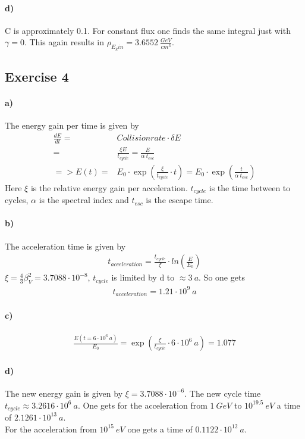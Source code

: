 \documentclass[10pt,a4paper]{article}
\begin{document}
\paragraph*{d)}
C is approximately 0.1. For constant flux one finds the same integral just with $\gamma = 0$. This again results in $\rho_{E_kin} = 3.6552\ \frac{GeV}{cm^3}$.

\subsection*{Exercise 4}
\paragraph*{a)}
The energy gain per time is given by 
\begin{align*}
\frac{dE}{dt} = &Collisionrate \cdot  \delta E \\
= &\frac{\xi E}{t_{cycle}} = \frac{E}{\alpha\ t_{esc}}\\
=> E(t) = &E_0 \cdot \exp\left(\frac{\xi}{t_{cycle}}\cdot t\right) = E_0 \cdot \exp\left(\frac{t}{\alpha\ t_{esc}}\right)
\end{align*}
Here $\xi$ is the relative energy gain per acceleration. $t_{cycle}$ is the time between to cycles, $\alpha$ is the spectral index and $t_{esc}$ is the escape time.

\paragraph{b)}
The acceleration time is given by
\begin{align*}
t_{acceleration} = \frac{t_{cycle}}{\xi} \cdot ln\left(\frac{E}{E_0}\right)
\end{align*}
$\xi = \frac{4}{3} \beta_V^2 = 3.7088 \cdot 10^{-8}$, $t_{cycle}$ is limited by d to $\approx 3\ a$. So one gets
\begin{align*}
t_{acceleration} = 1.21 \cdot 10^9\ a
\end{align*}

\paragraph{c)}
\begin{align*}
\frac{E(t=6\cdot 10^6\ a)}{E_0} = \exp\left(\frac{\xi}{t_{cycle}}\cdot 6\cdot 10^6\ a\right) = 1.077
\end{align*}

\paragraph{d)}
The new energy gain is given by $\xi = 3.7088\cdot 10^{-6}$. The new cycle time $t_{cycle} \approx 3.2616 \cdot 10^6\ a$. One gets for the acceleration from $1\ GeV$ to $10^{19.5}\ eV$ a time of $2.1261 \cdot 10^{13}\ a$. \\
For the acceleration from $10^{15}\ eV$ one gets a time of $0.1122 \cdot 10^{12}\ a$.
\end{document}
